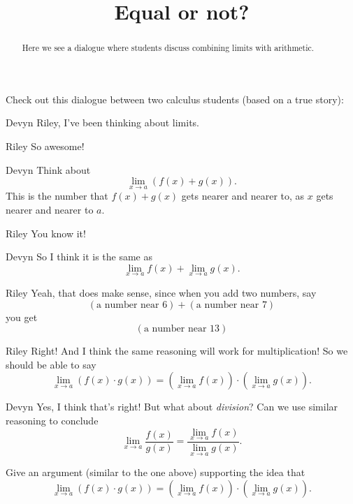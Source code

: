 \documentclass{ximera}
\title[Break-Ground:]{Equal or not?}
\begin{document}
\begin{abstract}
Here we see a dialogue where students discuss combining limits with
arithmetic.
\end{abstract}
\maketitle


Check out this dialogue between two calculus students (based on a true
story):

\begin{dialogue}
\item[Devyn] Riley, I've been thinking about limits.
\item[Riley] So awesome!
\item[Devyn] Think about
  \[
  \lim_{x\to a} \left(f(x) + g(x)\right).
  \]
  This is the number that $f(x) + g(x)$ gets nearer and nearer to, as $x$ gets nearer and nearer to $a$. 
\item[Riley] You know it!
\item[Devyn] So I think it is the same as
  \[
  \lim_{x\to a} f(x) + \lim_{x\to a}g(x).
  \]
\item[Riley] Yeah, that does make sense, since when you add two
  numbers, say
  \[
  (\text{a number near $6$}) + (\text{a number near $7$})
  \]
  you get
  \[
  (\text{a number near $13$})
  \]
\item[Riley] Right! And I think the same reasoning will work for
  multiplication! So we should be able to say
  \[
  \lim_{x\to a}\left(f(x) \cdot g(x)\right) = \left(\lim_{x\to a} f(x) \right)\cdot\left(\lim_{x\to a} g(x)\right).
  \]
\item[Devyn] Yes, I think that's right! But what about
  \textit{division}? Can we use similar reasoning to conclude
  \[
  \lim_{x\to a} \frac{f(x)}{g(x)} = \frac{\lim_{x\to a}
    f(x)}{\lim_{x\to a} g(x)}.
  \]
\end{dialogue}



\begin{problem}
  Give an argument (similar to the one above) supporting the idea that
  \[
  \lim_{x\to a}\left(f(x) \cdot g(x)\right) = \left(\lim_{x\to a} f(x) \right)\cdot\left(\lim_{x\to a} g(x)\right).
  \]
  \begin{freeResponse}
  \end{freeResponse}
\end{problem}


\end{document}
